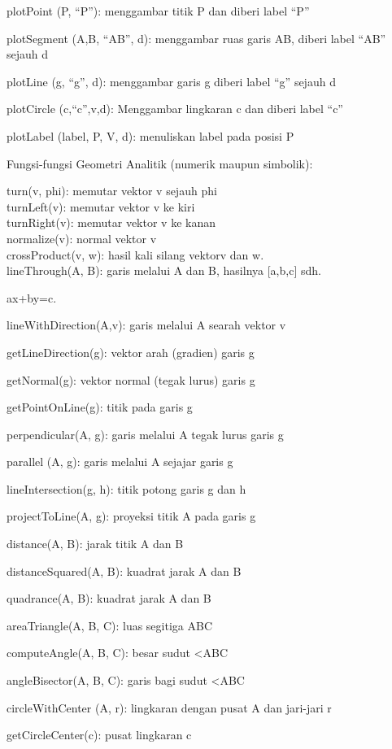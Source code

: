\documentclass[
]{book}
\begin{document}
plotPoint (P, ``P''): menggambar titik P dan diberi label ``P''

plotSegment (A,B, ``AB'', d): menggambar ruas garis AB, diberi label ``AB'' sejauh d

plotLine (g, ``g'', d): menggambar garis g diberi label ``g'' sejauh d

plotCircle (c,``c'',v,d): Menggambar lingkaran c dan diberi label ``c''

plotLabel (label, P, V, d): menuliskan label pada posisi P

Fungsi-fungsi Geometri Analitik (numerik maupun simbolik):

turn(v, phi): memutar vektor v sejauh phi\\
turnLeft(v): memutar vektor v ke kiri\\
turnRight(v): memutar vektor v ke kanan\\
normalize(v): normal vektor v\\
crossProduct(v, w): hasil kali silang vektorv dan w.\\
lineThrough(A, B): garis melalui A dan B, hasilnya {[}a,b,c{]} sdh.

ax+by=c.

lineWithDirection(A,v): garis melalui A searah vektor v

getLineDirection(g): vektor arah (gradien) garis g

getNormal(g): vektor normal (tegak lurus) garis g

getPointOnLine(g): titik pada garis g

perpendicular(A, g): garis melalui A tegak lurus garis g

parallel (A, g): garis melalui A sejajar garis g

lineIntersection(g, h): titik potong garis g dan h

projectToLine(A, g): proyeksi titik A pada garis g

distance(A, B): jarak titik A dan B

distanceSquared(A, B): kuadrat jarak A dan B

quadrance(A, B): kuadrat jarak A dan B

areaTriangle(A, B, C): luas segitiga ABC

computeAngle(A, B, C): besar sudut \textless ABC

angleBisector(A, B, C): garis bagi sudut \textless ABC

circleWithCenter (A, r): lingkaran dengan pusat A dan jari-jari r

getCircleCenter(c): pusat lingkaran c
\end{document}

